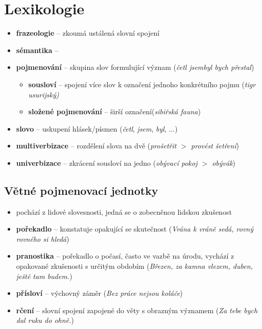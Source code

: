 \section{Lexikologie}
\begin{itemize}
\item \textbf{frazeologie} -- zkoumá ustálená slovní spojení
\item \textbf{sémantika} -- 
\item \textbf{pojmenování} -- skupina slov formulující význam (\textit{četl jsem}\textit{byl bych přestal})
	\begin{itemize}
	\item \textbf{sousloví} -- spojení více slov k označení jednoho konkrétního pojmu (\textit{tigr usurijský)}
	\item \textbf{složené pojmenování} -- širší označení(\textit{sibiřská fauna})
	\end{itemize}
\item \textbf{slovo} -- uskupení hlásek/písmen (\textit{četl}, \textit{jsem}, \textit{byl}, ...)
\item[] \textbf{multiverbizace} -- rozdělení slova na dvě (\textit{prošetřit $>$ provést šetření})
\item[] \textbf{univerbizace} -- zkrácení sousloví na jedno (\textit{obývací pokoj $>$ obývák})
\end{itemize}

\subsection{Větné pojmenovací jednotky}
\begin{itemize}
\item pochází z lidové slovesnosti, jedná se o zobecněnou lidskou zkušenost
\item \textbf{pořekadlo} -- konstatuje opakující se skutečnost (\textit{Vrána k vráně sedá, rovný rovného si hledá})
\item \textbf{pranostika} -- pořekadlo o počasí, často ve vazbě na úrodu, vychází z opakované zkušenosti s určitým obdobím (\textit{Březen, za kamna vlezem, duben, ještě tam budem.})
\item \textbf{přísloví} -- výchovný záměr (\textit{Bez práce nejsou koláče})
\item \textbf{rčení} -- slovní spojení zapojené do věty s obrazným významem (\textit{Za tebe bych dal ruku do ohně.})
\end{itemize}

